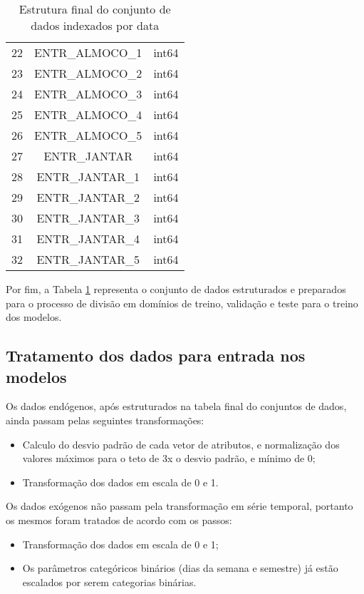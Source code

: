 \begin{table}[!ht]
\begin{tabular}{|c|c|c|}
                22&	ENTR\_ALMOCO\_1				&int64 \\
                23&	ENTR\_ALMOCO\_2				&int64 \\
                24&	ENTR\_ALMOCO\_3				&int64 \\ 
                25&	ENTR\_ALMOCO\_4				&int64 \\
                26&	ENTR\_ALMOCO\_5				&int64 \\
                27&	ENTR\_JANTAR				&	int64 \\ 
                28&	ENTR\_JANTAR\_1				&int64\\
                29&	ENTR\_JANTAR\_2				&int64 \\ 
                30&	ENTR\_JANTAR\_3				&int64 \\ 
                31&	ENTR\_JANTAR\_4				&int64 \\
                32&	ENTR\_JANTAR\_5				&int64\\
              \hline
            \end{tabular}
            \caption{Estrutura final do conjunto de dados indexados por data}
            \label{table:dataset_final}
        \end{table}
        Por fim, a Tabela \ref{table:dataset_final} representa o conjunto de dados estruturados e preparados para o processo de divisão em domínios de treino, validação e teste para o treino dos modelos.
        
        \subsection{Tratamento dos dados para entrada nos modelos}
         	Os dados endógenos, após estruturados na tabela final do conjuntos de dados, ainda passam pelas seguintes transformações:
         	\begin{itemize}
                \item	Calculo do desvio padrão de cada vetor de atributos, e normalização dos valores máximos para o teto de 3x o desvio padrão, e mínimo de 0; 
                \item	Transformação dos dados em escala de 0 e 1.
            \end{itemize}
            Os dados exógenos não passam pela transformação em série temporal, portanto os mesmos foram tratados de acordo com os passos:
            \begin{itemize}
                \item	Transformação dos dados em escala de 0 e 1;
                \item	Os parâmetros categóricos binários (dias da semana e semestre) já estão escalados por serem categorias binárias.
            \end{itemize}
